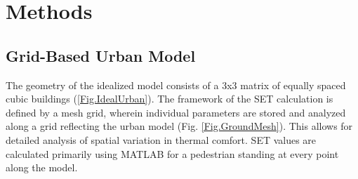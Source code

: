 \documentclass[preprint,3p,12pt,english]{elsarticle}
\begin{document}
%
%
%
%



\begin{table}[!t]
  \begin{framed}
  \footnotesize
    \printnomenclature
  \end{framed}
\end{table}


\section{Methods}
\subsection{Grid-Based Urban Model}
The geometry of the idealized model consists of a 3x3 matrix of equally spaced cubic buildings (\ref{Fig.IdealUrban}). The framework of the SET calculation is defined by a mesh grid, wherein individual parameters are stored and analyzed along a grid reflecting the urban model (Fig. \ref{Fig.GroundMesh}). This allows for detailed analysis of spatial variation in thermal comfort. SET values are calculated primarily using MATLAB for a pedestrian standing at every point along the model.
\end{document}
